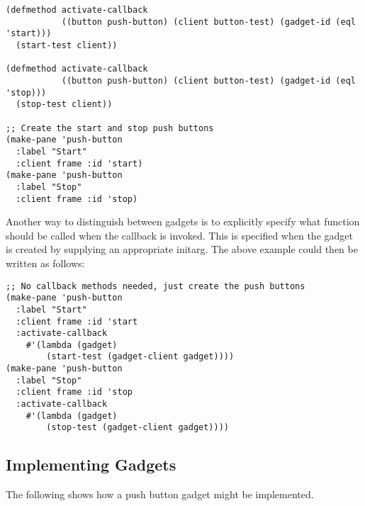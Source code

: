\begin{verbatim}
(defmethod activate-callback
           ((button push-button) (client button-test) (gadget-id (eql 'start)))
  (start-test client))

(defmethod activate-callback
           ((button push-button) (client button-test) (gadget-id (eql 'stop)))
  (stop-test client))

;; Create the start and stop push buttons
(make-pane 'push-button
  :label "Start"
  :client frame :id 'start)
(make-pane 'push-button
  :label "Stop"
  :client frame :id 'stop)
\end{verbatim}

Another way to distinguish between gadgets is to explicitly specify what
function should be called when the callback is invoked.  This is specified when
the gadget is created by supplying an appropriate initarg.  The above example
could then be written as follows:

\begin{verbatim}
;; No callback methods needed, just create the push buttons
(make-pane 'push-button
  :label "Start"
  :client frame :id 'start
  :activate-callback
    #'(lambda (gadget)
        (start-test (gadget-client gadget))))
(make-pane 'push-button
  :label "Stop"
  :client frame :id 'stop
  :activate-callback
    #'(lambda (gadget)
        (stop-test (gadget-client gadget))))
\end{verbatim}


\subsection {Implementing Gadgets}

The following shows how a push button gadget might be implemented.

